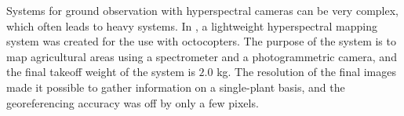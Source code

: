 Systems for ground observation with hyperspectral cameras can be very complex, which often leads to heavy systems. In \cite{hymsySUOMALAINEN}, a lightweight hyperspectral mapping system was created for the use with octocopters. The purpose of the system is to map agricultural areas using a spectrometer and a photogrammetric camera, and the final takeoff weight of the system is $2.0$ kg. The resolution of the final images made it possible to gather information on a single-plant basis, and the georeferencing accuracy was off by only a few pixels.

